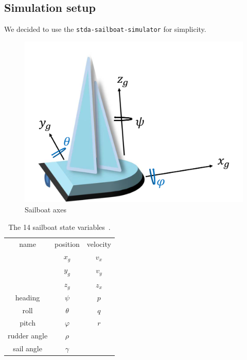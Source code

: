 \documentclass[conference]{IEEEtran}
\begin{document}
\subsection{Simulation setup}
We decided to use the \lstinline{stda-sailboat-simulator} for simplicity.
\begin{figure}
    \centering
    \includegraphics{documents/figures/alves_boat_with_buehler_axes.png}
    \caption{Sailboat axes~\cite{Alves2010}}
    \label{fig:sailboat_components}
\end{figure}
\begin{table}
    
    \centering
    \begin{tabular}{ccc}
    name & position & velocity \\
     &\(x_g\) & \(v_x\) \\
     &\(y_g\) & \(v_y\) \\
     &\(z_g\) & \(z_x\) \\
     heading&\(\psi\) & \(p\) \\
     \textcolor{officeblue}{roll} & \textcolor{officeblue}{\(\theta\)} & \textcolor{officeblue}{\(q\)} \\
     \textcolor{officeblue}{pitch}&\textcolor{officeblue}{\(\varphi\)} & \textcolor{officeblue}{\(r\)} \\
     \textcolor{officeblue}{rudder angle} & \textcolor{officeblue}{\(\rho\)} & \\
     \textcolor{officeblue}{sail angle}   & \textcolor{officeblue}{\(\gamma\)} & 
    \end{tabular}
    \caption{The 14 sailboat state variables~\cite{Buehler2018}.}
    \label{tab:state_vars}
\end{table}
\end{document}
